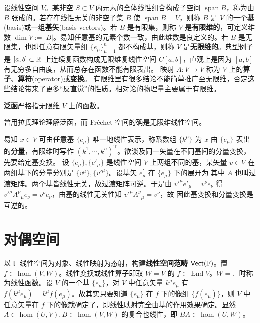 设线性空间 $V$。某非空 $S\subset V$ 内元素的全体线性组合构成子空间 $\operatorname{span}B$，称为由 $B$ 张成的。若存在线性无关的非空子集 $B$ 使 $\operatorname{span}B=V$，则称 $B$ 是 $V$ 的一个\textbf{基}(basis)或一组\textbf{基矢}(basis vectors)。若 $B$ 是有限集，则称 $V$ 是\textbf{有限维的}，可定义维数 $\dim V:=|B|$。易知任意基的元素个数一致，由此维数是良定义的。若 $B$ 是无限集，也即任意有限矢量组 $\{e_\mu\}_{\mu=1}^n$ 都不构成基，则称 $V$ 是\textbf{无限维的}。典型例子是 $[a, b] \subset \mathbb{R}$ 上连续复函数构成无限维复线性空间 $C[a, b]$，直观上是因为 $[a, b]$ 有无穷多自由度，从而总存在函数不能有限表出。
映射 $A:V\to V$ 称为 $V$ 上的\textbf{算子}、\textbf{算符}(operator)或\textbf{变换}。
有限维里有很多结论不能简单推广至无限维，否定这些结论带来了更多“反直觉”的性质。相对论的物理量主要属于有限维。

\begin{definition}
    \textbf{泛函}严格指无限维 $V$ 上的函数。
\end{definition}

\begin{remark}
    曾用拉氏理论理解泛函，而 Fréchet 空间的确是无限维线性空间。
\end{remark}

易知 $x\in V$ 可由任意基 $\{e_\mu\}$ 唯一地线性表示，称系数组 $\{k^\mu\}$ 为 $x$ 由 $\{e_\mu\}$ 表出的\textbf{分量}，有限维时写作 $(k^1,\cdots,k^n)^\mathrm{T}$。欲谈及同一矢量在不同基间的分量变换，先要给定基变换。
设 $\{e_\mu\},\{e'_\mu\}$ 是线性空间 $V$ 上两组不同的基，某矢量 $v\in V$ 在两组基下的分量分别是 $\{v^\mu\},\{v'^\mu\}$。设基矢 $e_\mu^{\prime}$ 在 $\{e_\mu\}$ 下的展开为
其中 $A$ 也叫过渡矩阵。两个基皆线性无关，故过渡矩阵可逆。于是由 $v'^\mu e'_\mu=v^\nu e_\nu$ 得 $v'^\mu A^\nu{ }_\mu e_\nu=v^\nu e_\nu$，由基的线性无关性知 $v'^\mu A^\nu{ }_\mu =v^\nu$，故
因此基变换和分量变换是互逆的。

\section{对偶空间}

以 $\mathbb F$-线性空间为对象、线性映射为态射，构建\textbf{线性空间范畴} $\mathsf{Vect}(\mathbb F)$。置 $f\in\hom(V,W)$。线性变换或线性算子即取 $W=V$ 的 $f\in\operatorname{End} V$。$W=\mathbb F$ 时称为线性函数。设 $V$ 的一个基 $\{e_\mu\}$，对 $V$ 中任意矢量 $k^\mu e_\mu$ 有 $f\left(k^\mu e_\mu\right)=k^\mu f(e_\mu)$。故其实只要知道 $\{e_\mu\}$ 在 $f$ 下的像组 $\{f(e_\mu)\}$，则 $V$ 中任意矢量在 $f$ 下的像就确定了，即线性映射完全由基的作用效果确定。显然 $A\in\hom(U,V),B\in\hom(V,W)$ 的复合也线性，即 $BA\in\hom(U,W)$。

